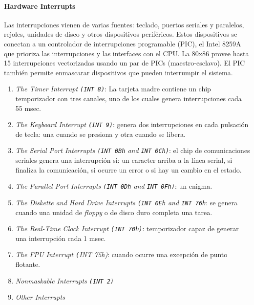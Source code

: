 \paragraph{\textnormal{\textbf{Hardware Interrupts}}}
Las interrupciones vienen de varias fuentes: teclado, puertos seriales y paralelos, rejoles, unidades de disco y otros dispositivos periféricos. Estos dispositivos se conectan a un controlador de interrupciones programable (PIC), el Intel 8259A  que prioriza las interrupciones y las interfaces con el CPU. La 80x86 provee hasta 15 interrupciones vectorizadas usando un par de PICs (maestro-esclavo). El PIC también permite enmascarar dispositivos que pueden interrumpir el sistema. 

\begin{enumerate}
    \item \textit{The Timer Interrupt \texttt{(INT 8)}}: La tarjeta madre contiene un chip temporizador con tres canales, uno de los cuales genera interrupciones cada 55 msec.
    \item \textit{The Keyboard Interrupt \texttt{(INT 9)}}: genera dos interrupciones en cada pulsación de tecla: una cuando se presiona y otra cuando se libera.
    \item \textit{The Serial Port Interrupts \texttt{(INT 0Bh} and \texttt{INT 0Ch)}}: el chip de comunicaciones seriales genera una interrupción si: un caracter arriba a la línea serial, si finaliza la comunicación, si ocurre un error o si hay un cambio en el estado.
    \item \textit{The Parallel Port Interrupts \texttt{(INT 0Dh} and \texttt{INT 0Fh)}}: un enigma.
    \item \textit{The Diskette and Hard Drive Interrupts \texttt{(INT 0Eh} and \texttt{INT 76h}}: se genera cuando una unidad de \textit{floppy} o de disco duro completa una tarea.
    \item \textit{The Real-Time Clock Interrupt \texttt{(INT 70h)}}: temporizador capaz de generar una interrupción cada 1 msec.
    \item \textit{The FPU Interrupt \texttt(INT 75h)}: cuando ocurre una excepción de punto flotante.
    \item \textit{Nonmaskable Interrupts \texttt{(INT 2)}}
    \item \textit{Other Interrupts}
\end{enumerate}

